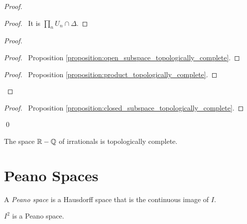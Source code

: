 \begin{proof}
    \pf
    \begin{proof}
        \pf\ It is $\prod_n U_n \cap \Delta$.
    \end{proof}
    \begin{proof}
        \begin{proof}
            \pf\ Proposition \ref{proposition:open_subspace_topologically_complete}.
        \end{proof}
        \qedstep
        \begin{proof}
            \pf\ Proposition \ref{proposition:product_topologically_complete}.
        \end{proof}
    \end{proof}
    \begin{proof}
        \pf\ Proposition \ref{proposition:closed_subspace_topologically_complete}.
    \end{proof}
\qed
\end{proof}

\begin{corollary}
    The space $\mathbb{R} - \mathbb{Q}$ of irrationals is topologically complete.
\end{corollary}

\section{Peano Spaces}

\begin{definition}
    A \emph{Peano space} is a Hausdorff space that is the continuous image of $I$.
\end{definition}

\begin{theorem}
    $I^2$ is a Peano space.
\end{theorem}

